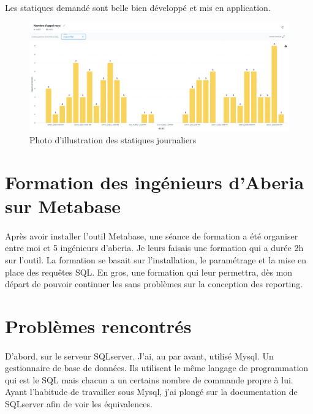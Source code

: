 \documentclass[a4paper,12pt]{report}
\begin{document}
\paragraph*{}

Les statiques demandé sont belle bien développé et mis en application. 

\begin{figure}[!h]
\begin{center}
\includegraphics[width=17cm]{image/clienta.png}
\end{center}
\caption{Photo d'illustration des statiques journaliers}
\label{Photo d'illustration}
\end{figure}

\section{Formation des ingénieurs d'Aberia sur Metabase}
\paragraph*{}
Après avoir installer l’outil Metabase, une séance de formation a été organiser entre moi et 5  ingénieurs d’aberia. Je leurs faisais une formation qui a durée 2h sur l’outil. La formation se basait sur l’installation, le paramétrage et la mise en place des requêtes SQL.  En gros, une formation qui leur permettra, dès mon départ de pouvoir continuer les sans problèmes sur la conception des reporting. 

\section{Problèmes rencontrés}
\paragraph{}
              
       D’abord, sur le serveur SQLserver. J’ai, au par avant, utilisé Mysql. Un gestionnaire de base de données. Ils utilisent le même langage de programmation qui est le SQL mais chacun a un certains nombre de commande propre à lui. Ayant l’habitude de travailler sous Mysql, j’ai plongé sur la documentation  de SQLserver afin de voir  les équivalences.\newline 
       
\end{document}
